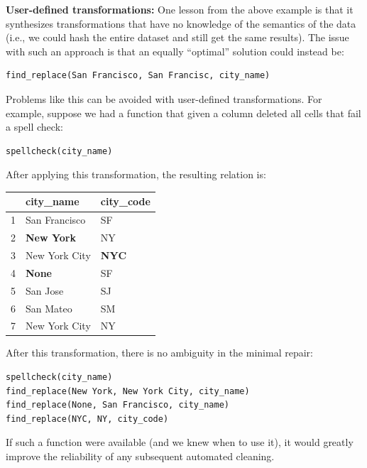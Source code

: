 \vspace{0.5em}\noindent\textbf{User-defined transformations: }
One lesson from the above example is that it synthesizes transformations that have no knowledge of the semantics of the data (i.e., we could hash the entire dataset and still get the same results).
The issue with such an approach is that an equally ``optimal'' solution could instead be:
\begin{lstlisting}
find_replace(San Francisco, San Francisc, city_name)
\end{lstlisting}
Problems like this can be avoided with user-defined transformations.
For example, suppose we had a function that given a column deleted all cells that fail a spell check:
\begin{lstlisting}
spellcheck(city_name)
\end{lstlisting}
After applying this transformation, the resulting relation is:
\begin{table}[ht!]
\centering
\label{my-label}
\begin{tabular}{|l|l|l|}
\hline
\rowcolor[HTML]{000000} 
& {\color[HTML]{FFFFFF} city\_name}            & {\color[HTML]{FFFFFF} city\_code}   \\ \hline
1 & San Francisco                                & SF                                  \\ \hline
2& {\color[HTML]{FE0000} \textbf{New York}}     & NY                                  \\ \hline
3 & New York City                                & {\color[HTML]{FE0000} \textbf{NYC}} \\ \hline
4 & {\color[HTML]{005500} \textbf{None}} & SF                                  \\ \hline
5 & San Jose                                     & SJ                                  \\ \hline
6 & San Mateo                                    & SM                                  \\ \hline
7 & New York City                                & NY                                  \\ \hline
\end{tabular}
\end{table}
After this transformation, there is no ambiguity in the minimal repair:
\begin{lstlisting}
spellcheck(city_name)
find_replace(New York, New York City, city_name)
find_replace(None, San Francisco, city_name)
find_replace(NYC, NY, city_code)
\end{lstlisting}
If such a function were available (and we knew when to use it), it would greatly improve the reliability of any subsequent automated cleaning.


